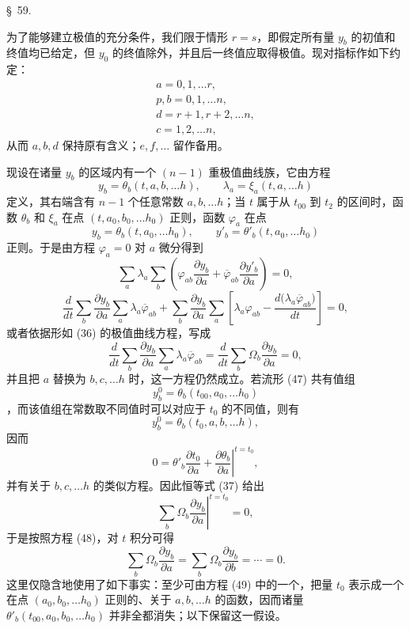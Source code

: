 \documentclass[11pt,a4paper,leqno]{article}
\begin{document}
\begin{center}
{\large \S~59.}
\end{center}

为了能够建立极值的充分条件，我们限于情形 $r=s$，即假定所有量 $y_b$ 的初值和终值均已给定，但 $y_0$ 的终值除外，并且后一终值应取得极值。现对指标作如下约定：
\[
\begin{gathered}
a=0,1,\ldots r,\\
p,b=0,1,\ldots n,\\
d=r+1,r+2,\ldots n,\\
c=1,2,\ldots n,
\end{gathered}
\]
从而 $a,b,d$ 保持原有含义；$e,f,\ldots$ 留作备用。

现设在诸量 $y_b$ 的区域内有一个 $(n-1)$ 重极值曲线族，它由方程
\begin{equation}\tag{47}
y_b=\theta_b(t,a,b,\ldots h),
\qquad
\lambda_a=\xi_a(t,a,\ldots h)
\end{equation}
定义，其右端含有 $n-1$ 个任意常数 $a,b,\ldots h$；当 $t$ 属于从 $t_{00}$ 到 $t_2$ 的区间时，函数 $\theta_b$ 和 $\xi_a$ 在点 $(t,a_0,b_0,\ldots h_0)$ 正则，函数 $\varphi_a$ 在点
\[
y_b=\theta_b(t,a_0,\ldots h_0),
\qquad
y'_b=\theta'_b(t,a_0,\ldots h_0)
\]
正则。于是由方程 $\varphi_a=0$ 对 $a$ 微分得到
\[
\sum_a\lambda_a\sum_b
\left(
\varphi_{ab}\frac{\partial y_b}{\partial a}
+\overline{\varphi}_{ab}\frac{\partial y'_b}{\partial a}
\right)=0,
\]
\[
\frac{d}{dt}\sum_b\frac{\partial y_b}{\partial a}
\sum_a\lambda_a\overline{\varphi}_{ab}
+\sum_b\frac{\partial y_b}{\partial a}
\sum_a\left[
\lambda_a\varphi_{ab}-
\frac{d\bigl(\lambda_a\overline{\varphi}_{ab}\bigr)}{dt}
\right]=0,
\]
或者依据形如 (36) 的极值曲线方程，写成
\begin{equation}\tag{48}
\frac{d}{dt}\sum_b\frac{\partial y_b}{\partial a}
\sum_a\lambda_a\overline{\varphi}_{ab}
=\frac{d}{dt}\sum_b\Omega_b\frac{\partial y_b}{\partial a}=0,
\end{equation}
并且把 $a$ 替换为 $b,c,\ldots h$ 时，这一方程仍然成立。若流形 (47) 共有值组
\[
y_b^0=\theta_b(t_{00},a_0,\ldots h_0)
\]
，而该值组在常数取不同值时可以对应于 $t_0$ 的不同值，则有
\begin{equation}\tag{49}
y_b^0=\theta_b(t_0,a,b,\ldots h),
\end{equation}
因而
\[
0=\theta'_b\frac{\partial t_0}{\partial a}
+\left.\frac{\partial\theta_b}{\partial a}\right|^{t=t_0},
\]
并有关于 $b,c,\ldots h$ 的类似方程。因此恒等式 (37) 给出
\[
\left.\sum_b\Omega_b\frac{\partial y_b}{\partial a}\right|^{t=t_0}=0,
\]
于是按照方程 (48)，对 $t$ 积分可得
\begin{equation}\tag{50}
\sum_b\Omega_b\frac{\partial y_b}{\partial a}
=\sum_b\Omega_b\frac{\partial y_b}{\partial b}=\cdots=0.
\end{equation}
这里仅隐含地使用了如下事实：至少可由方程 (49) 中的一个，把量 $t_0$ 表示成一个在点 $(a_0,b_0,\ldots h_0)$ 正则的、关于 $a,b,\ldots h$ 的函数，因而诸量 $\theta'_b(t_{00},a_0,b_0,\ldots h_0)$ 并非全都消失；以下保留这一假设。
\end{document}
